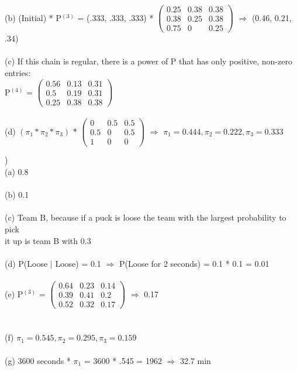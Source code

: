 \documentclass[12pt]{article}
\begin{document}
\indent (b) 
(Initial) * P$^{(3)}$ = (.333, .333, .333) * 
$\begin{pmatrix}
0.25 & 0.38 & 0.38\\
0.38 & 0.25 & 0.38 \\
0.75 & 0 & 0.25 
\end{pmatrix}$ $\Rightarrow$ (0.46, 0.21, .34) \\\\

\indent (c) If this chain is regular, there is a power of P that has only positive, non-zero entries:\\
\indent \indent P$^{(4)}$ = 
$\begin{pmatrix}
0.56 & 0.13 & 0.31\\
0.5 & 0.19 & 0.31 \\
0.25 & 0.38 & 0.38 
\end{pmatrix}$ \checkmark\\\\

\indent (d)
$(\pi_1 * \pi_2 * \pi_3)$ * $\begin{pmatrix}
0 & 0.5 & 0.5\\
0.5 & 0 & 0.5\\
1 & 0 & 0
\end{pmatrix}$ $\Rightarrow$ $\pi_1 = 0.444, \pi_2 = 0.222, \pi_3 = 0.333$ \\


\noindent \hrulefill 


)\\
\indent (a) 0.8\\\\
\indent (b) 0.1\\\\
\indent (c) Team B, because if a puck is loose the team with the largest probability to pick \\
\indent \indent  it up is team B with 0.3\\\\
\indent (d) P(Loose $|$ Loose) = 0.1 $\Rightarrow$ P(Loose for 2 seconds) = 0.1 * 0.1 = 0.01\\\\
\indent (e) P$^{(3)}$ = 
$\begin{pmatrix}
0.64 & 0.23 & 0.14 \\
0.39 & 0.41 & 0.2  \\
0.52 & 0.32 & 0.17 
\end{pmatrix}$ $\Rightarrow$ 0.17\\\\\\[-.8em]
\indent (f) $\pi_1 = 0.545, \pi_2 = 0.295, \pi_3 = 0.159$ \\\\
\indent (g) 3600 seconds * $\pi_1$ = 3600 * .545 = 1962 $\Rightarrow$ 32.7 min\\
\end{document}
